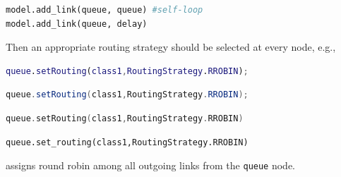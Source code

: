 \begin{PYTHON}
\begin{lstlisting}[language = python]
model.add_link(queue, queue) #self-loop
model.add_link(queue, delay)
\end{lstlisting}
\end{PYTHON}
Then an appropriate routing strategy should be selected at every node, e.g.,
\begin{MATLAB}
\begin{lstlisting}[language = matlab]
queue.setRouting(class1,RoutingStrategy.RROBIN);
\end{lstlisting}
\end{MATLAB}
\begin{JAVA}
\begin{lstlisting}[language = java, basicstyle=\ttfamily\scriptsize]
queue.setRouting(class1,RoutingStrategy.RROBIN);
\end{lstlisting}
\end{JAVA}
\begin{KOTLIN}
\begin{lstlisting}[language = kotlin, basicstyle=\ttfamily\scriptsize]
queue.setRouting(class1,RoutingStrategy.RROBIN)
\end{lstlisting}
\end{KOTLIN}
\begin{PYTHON}
\begin{lstlisting}[language = python]
queue.set_routing(class1,RoutingStrategy.RROBIN)
\end{lstlisting}
\end{PYTHON}
assigns round robin among all outgoing links from the \texttt{queue} node.

